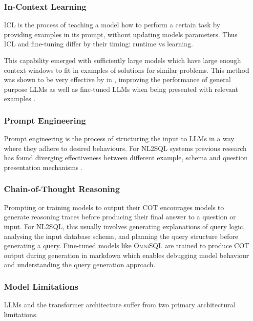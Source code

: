 \subsubsection{In-Context Learning}

ICL is the process of teaching a model how to perform a certain task by
providing examples in its prompt, without updating models parameters. Thus ICL
and fine-tuning differ by their timing: runtime vs learning.

This capability emerged with sufficiently large models which have large enough
context windows to fit in examples of solutions for similar problems. This
method was shown to be very effective by \citeauthor{DAIL-SQL} in
\citeyear{DAIL-SQL}, improving the performance of general purpose LLMs as well
as fine-tuned LLMs when being presented with relevant examples
\citep{DAIL-SQL}.

\subsubsection{Prompt Engineering}

Prompt engineering is the process of structuring the input to LLMs in a way
where they adhere to desired behaviours. For NL2SQL systems previous research
has found diverging effectiveness between different example, schema and
question presentation mechanisms \citep{DAIL-SQL, OmniSQL}.

\subsubsection{Chain-of-Thought Reasoning}

Prompting or training models to output their COT encourages models to generate
reasoning traces before producing their final answer to a question or input.
For NL2SQL, this usually involves generating explanations of query logic,
analysing the input database schema, and planning the query structure before
generating a query. Fine-tuned models like \textsc{OmniSQL} are trained to
produce COT output during generation in markdown which enables debugging model
behaviour and understanding the query generation approach. 

\subsubsection{Model Limitations}

LLMs and the transformer architecture suffer from two primary architectural
limitations.

